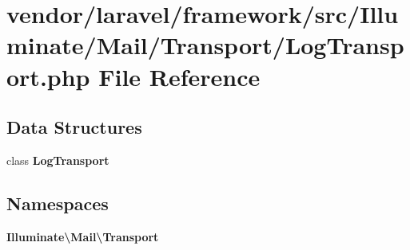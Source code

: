 \section{vendor/laravel/framework/src/\+Illuminate/\+Mail/\+Transport/\+Log\+Transport.php File Reference}
\label{_log_transport_8php}
\subsection*{Data Structures}
\begin{DoxyCompactItemize}
\item 
class {\bf Log\+Transport}
\end{DoxyCompactItemize}
\subsection*{Namespaces}
\begin{DoxyCompactItemize}
\item 
 {\bf Illuminate\textbackslash{}\+Mail\textbackslash{}\+Transport}
\end{DoxyCompactItemize}

